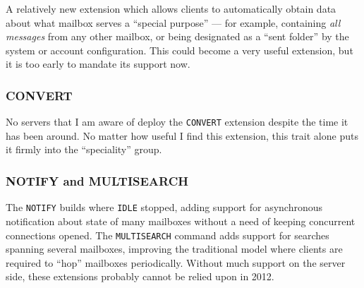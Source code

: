 \documentclass[trojita]{subfiles}
\begin{document}
A relatively new extension which allows clients to automatically obtain data about what mailbox serves a ``special
purpose'' --- for example, containing {\em all messages} from any other mailbox, or being designated as a ``sent
folder'' by the system or account configuration.  This could become a very useful extension, but it is too early to
mandate its support now.

\subsubsection{CONVERT}

No servers that I am aware of deploy the {\tt CONVERT} extension despite the time it has been around.  No matter how
useful I find this extension, this trait alone puts it firmly into the ``speciality'' group.

\subsubsection{NOTIFY and MULTISEARCH}

The {\tt NOTIFY} builds where {\tt IDLE} stopped, adding support for asynchronous notification about state of many
mailboxes without a need of keeping concurrent connections opened.  The {\tt MULTISEARCH} command adds support for
searches spanning several mailboxes, improving the traditional model where clients are required to ``hop'' mailboxes
periodically.  Without much support on the server side, these extensions probably cannot be relied upon in 2012.
\end{document}
